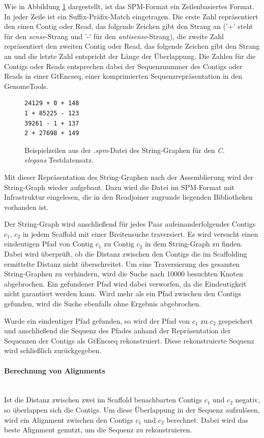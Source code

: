 \documentclass[a4paper,11pt,parskip]{scrartcl}
\begin{document}
Wie in Abbildung \ref{abb: spm} dargestellt, ist das SPM-Format ein
Zeilenbasiertes Format. In jeder Zeile ist ein Suffix-Präfix-Match
eingetragen. Die erste Zahl repräsentiert den einen Contig oder Read,
das folgende Zeichen gibt den Strang an ('+' steht für den
\textit{sense}-Strang und '-' für den \textit{antisense}-Strang), die
zweite Zahl repräsentiert den zweiten Contig oder Read, das folgende
Zeichen gibt den Strang an und die letzte Zahl entspricht der Länge
der Überlappung. Die Zahlen für die Contigs oder Reads entsprechen
dabei der Sequenznummer des Contigs oder Reads in einer GtEncseq,
einer komprimierten Sequenzrepräsentation in den GenomeTools.

\begin{figure}
  \centering
\begin{verbatim}
24129 + 0 + 148
1 + 85225 - 123
39261 - 1 + 137
2 + 27698 + 149
\end{verbatim}
\caption{\label{abb: spm}Beispielzeilen aus der \textit{.spm}-Datei des
  String-Graphen für den \textit{C. elegans} Testdatensatz.}
\end{figure}

Mit dieser Repräsentation des String-Graphen nach der Assemblierung
wird der String-Graph wieder aufgebaut. Dazu wird die Datei im
SPM-Format mit Infrastruktur eingelesen, die in den Readjoiner
zugrunde liegenden Bibliotheken vorhanden ist.

Der String-Graph wird anschließend für jedes Paar
aufeinanderfolgender Contigs $c_1$, $c_2$ in jedem Scaffold mit einer
Breitensuche traversiert. Es wird versucht einen eindeutigen Pfad von
Contig $c_1$ zu Contig $c_2$ in dem String-Graph zu finden. Dabei wird
überprüft, ob die Distanz zwischen den Contigs die im Scaffolding
ermittelte Distanz nicht überschreitet. Um eine Traversierung des
gesamten String-Graphen zu verhindern, wird die Suche nach \num{10000}
besuchten Knoten abgebrochen. Ein gefundener Pfad wird dabei
verworfen, da die Eindeutigkeit nicht garantiert werden kann. Wird
mehr als ein Pfad zwischen den Contigs gefunden, wird die Suche
ebenfalls ohne Ergebnis abgebrochen.

Wurde ein eindeutiger Pfad gefunden, so wird der Pfad von $c_1$ zu
$c_2$ gespeichert und anschließend die Sequenz des Pfades anhand der
Repräsentation der Sequenzen der Contigs als GtEncseq rekonstruiert.
Diese rekonstruierte Sequenz wird schließlich zurückgegeben.

\paragraph{Berechnung von Alignments}~\\
Ist die Distanz zwischen zwei im Scaffold benachbarten Contigs $c_1$
und $c_2$ negativ, so überlappen sich die Contigs. Um diese
Überlappung in der Sequenz aufzulösen, wird ein Alignment zwischen den
Contigs $c_1$ und $c_2$ berechnet. Dabei wird das beste Alignment
genutzt, um die Sequenz zu rekonstruieren.
\end{document}
